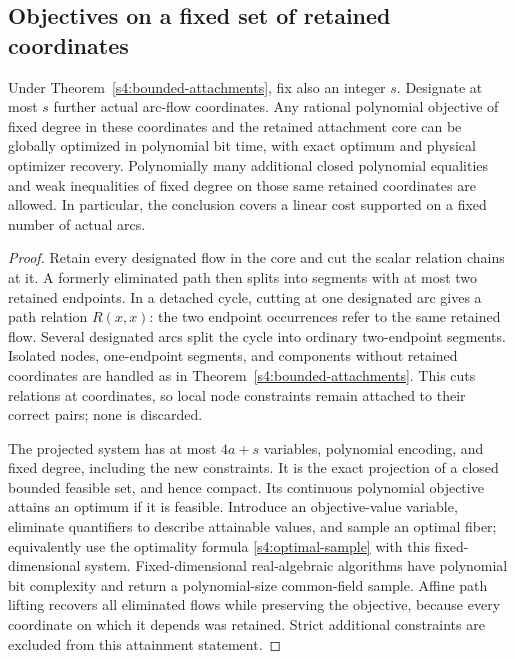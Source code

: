 \subsection{Objectives on a fixed set of retained coordinates}
\label{s4:bounded-support}

\begin{theorem}
\label{s4:fixed-support}
Under Theorem~\ref{s4:bounded-attachments}, fix also an integer $s$.
Designate at most $s$ further actual arc-flow coordinates. Any rational
polynomial objective of fixed degree in these coordinates and the
retained attachment core can be globally optimized in polynomial bit
time, with exact optimum and physical optimizer recovery. Polynomially
many additional closed polynomial equalities and weak inequalities
of fixed degree on those same retained coordinates are allowed.
In particular, the conclusion covers a linear cost supported on a
fixed number of actual arcs.
\end{theorem}
\begin{proof}
Retain every designated flow in the core and cut the scalar relation
chains at it. A formerly eliminated path then splits into segments
with at most two retained endpoints. In a detached cycle, cutting at
one designated arc gives a path relation $R(x,x)$: the two endpoint
occurrences refer to the same retained flow. Several designated arcs
split the cycle into ordinary two-endpoint segments. Isolated nodes,
one-endpoint segments, and components without retained coordinates
are handled as in Theorem~\ref{s4:bounded-attachments}. This cuts
relations at coordinates, so local node constraints remain attached
to their correct pairs; none is discarded.

The projected system has at most $4a+s$ variables, polynomial
encoding, and fixed degree, including the new constraints. It is the
exact projection of a closed bounded feasible set, and hence compact.
Its continuous polynomial objective attains an optimum if it is
feasible. Introduce an objective-value variable, eliminate quantifiers
to describe attainable values, and sample an optimal fiber; equivalently
use the optimality formula \eqref{s4:optimal-sample} with this
fixed-dimensional system. Fixed-dimensional real-algebraic algorithms
have polynomial bit complexity and return a polynomial-size common-field
sample. Affine path lifting recovers all eliminated flows while
preserving the objective, because every coordinate on which it
depends was retained. Strict additional constraints are excluded from
this attainment statement.
\end{proof}

